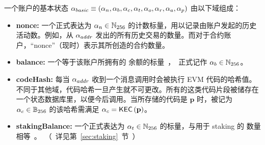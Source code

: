 一个账户的基本状态 $\mathbf{\alpha}_{basic} \equiv\left( \mathbf{\alpha}_n, \mathbf{\alpha}_b, \mathbf{\alpha}_c,\mathbf{\alpha}_t, \mathbf{\alpha}_o, \mathbf{\alpha}_r, \mathbf{\alpha}_a, \mathbf{\alpha}_p\right)$ 由以下域组成：
\begin{itemize}[nosep]
	\item {\bf nonce:} 一个正式表达为 $\mathbf{\alpha}_n\in \mathbb{N}_{256}$ 的计数标量，用以记录由账户发起的历史活动数。例如，从 $\mathbf{\alpha}_{addr}$ 发出的所有历史交易的数量。而对于合约账户，“nonce”（现时）表示其所创造的合约数量。

	\item {\bf balance:} 一个等于该账户所拥有的 \unit 余额的标量，正式记作 $\mathbf{\alpha}_b\in \mathbb{N}_{256}$。

	\item {\bf codeHash:} 每当 $\mathbf{\alpha}_{addr}$ 收到一个消息调用时会被执行 EVM 代码的哈希值。不同于其他域，代码哈希一旦产生就不可更改。所有的这类代码片段被储存在一个状态数据库里，以便今后调用。当所存储的代码是 $\mathbf{p}$ 时，被记为 $\mathbf{\alpha}_c\in \mathbb{B}_{256}$ 的该哈希需满足 $\mathbf{\alpha}_c=\mathsf{KEC}\left(\mathbf{p} \right)$。  

	\item {\bf stakingBalance:} 一个正式表达为 $\mathbf{\alpha}_t\in \mathbb{N}_{256}$ 的标量，与用于 staking 的 \unit 数量相等。（详见第 \ref{sec:staking} 节）


\end{itemize}
